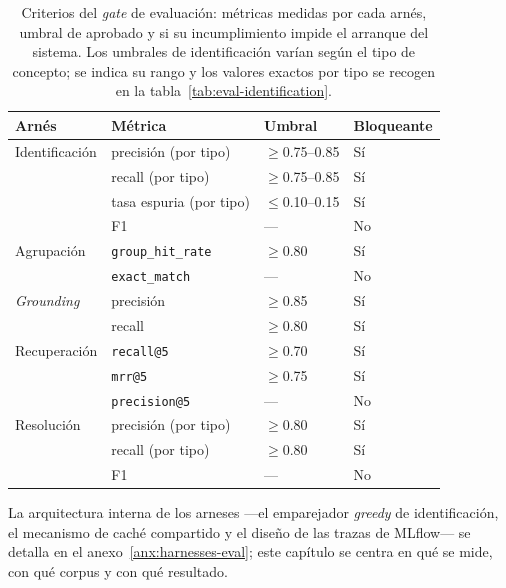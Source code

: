 \begin{table}[htbp]
  \centering
  \small
  \setlength{\tabcolsep}{12pt}
  \begin{tabular}{l l l l}
    \toprule
    \textbf{Arnés} & \textbf{Métrica} & \textbf{Umbral} & \textbf{Bloqueante} \\
    \midrule
    Identificación & precisión (por tipo)  & $\geq$0.75--0.85 & Sí \\
                   & recall (por tipo)     & $\geq$0.75--0.85 & Sí \\
                   & tasa espuria (por tipo) & $\leq$0.10--0.15 & Sí \\
                   & F1                    & ---              & No \\
    \addlinespace
    \cmidrule[0.02em]{1-4}
    Agrupación & \texttt{group\_hit\_rate} & $\geq$0.80 & Sí \\
               & \texttt{exact\_match}     & ---        & No \\
    \addlinespace
    \cmidrule[0.02em]{1-4}
    \textit{Grounding} & precisión & $\geq$0.85 & Sí \\
                       & recall    & $\geq$0.80 & Sí \\
    \addlinespace
    \cmidrule[0.02em]{1-4}
    Recuperación & \texttt{recall@5}    & $\geq$0.70 & Sí \\
                 & \texttt{mrr@5}       & $\geq$0.75 & Sí \\
                 & \texttt{precision@5} & ---        & No \\
    \addlinespace
    \cmidrule[0.02em]{1-4}
    Resolución & precisión (por tipo) & $\geq$0.80 & Sí \\
               & recall (por tipo)    & $\geq$0.80 & Sí \\
               & F1                   & ---        & No \\
    \bottomrule
  \end{tabular}
  \caption{Criterios del \textit{gate} de evaluación: métricas medidas por cada arnés, umbral de
           aprobado y si su incumplimiento impide el arranque del sistema. Los umbrales de
           identificación varían según el tipo de concepto; se indica su rango y los valores
           exactos por tipo se recogen en la tabla~\ref{tab:eval-identification}.}
  \label{tab:eval-gate-criteria}
\end{table}

La arquitectura interna de los arneses —el emparejador \textit{greedy} de identificación, el
mecanismo de caché compartido y el diseño de las trazas de MLflow— se detalla en el
anexo~\ref{anx:harnesses-eval}; este capítulo se centra en qué se mide, con qué corpus y con qué
resultado.

